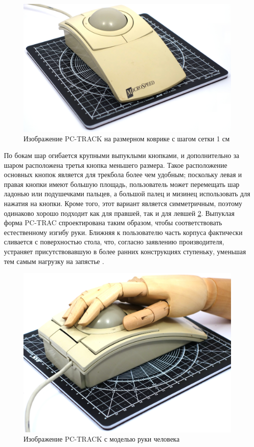 \documentclass[11pt, a4paper]{article}
\begin{document}
\begin{figure}[h]
    \centering
    \includegraphics[scale=0.3]{1991_microspeed_pc-track/size_60.jpg}
    \caption{Изображение PC-TRACK на размерном коврике с шагом сетки 1 см}
    \label{fig:PCTRACKSize}
\end{figure}

По бокам шар огибается крупными выпуклыми кнопками, и дополнительно за шаром расположена третья кнопка меньшего размера. Такое расположение основных кнопок является для трекбола более чем удобным; поскольку левая и правая кнопки имеют большую площадь, пользователь может перемещать шар ладонью или подушечками пальцев, а большой палец и мизинец использовать для нажатия на кнопки. Кроме того, этот вариант является симметричным, поэтому одинаково хорошо подходит как для правшей, так и для левшей \ref{fig:PCTRACKHand}. Выпуклая форма PC-TRAC спроектирована таким образом, чтобы соответствовать естественному изгибу руки. Ближняя к пользователю часть корпуса фактически сливается с поверхностью стола, что, согласно заявлению производителя, устраняет присутствовавшую в более ранних конструкциях ступеньку, уменьшая тем самым нагрузку на запястье \cite{PC}.

\begin{figure}[h]
    \centering
    \includegraphics[scale=0.3]{1991_microspeed_pc-track/hand_60.jpg}
    \caption{Изображение PC-TRACK с моделью руки человека}
    \label{fig:PCTRACKHand}
\end{figure}
\end{document}
